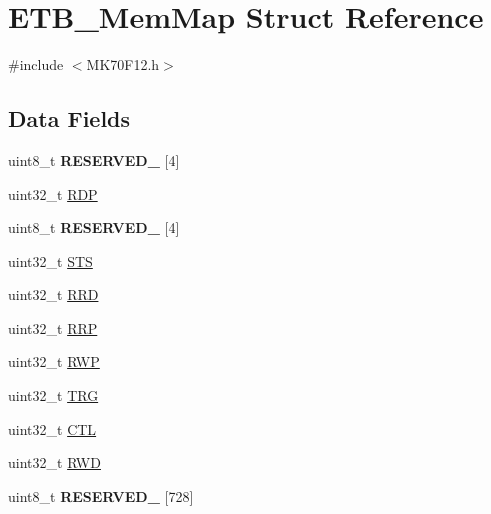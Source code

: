 \hypertarget{struct_e_t_b___mem_map}{}\section{E\+T\+B\+\_\+\+Mem\+Map Struct Reference}
\label{struct_e_t_b___mem_map}


{\ttfamily \#include $<$M\+K70\+F12.\+h$>$}

\subsection*{Data Fields}
\begin{DoxyCompactItemize}
\item 
\hypertarget{struct_e_t_b___mem_map_af724f31f25bbd8ea68c27823c1dad054}{}uint8\+\_\+t {\bfseries R\+E\+S\+E\+R\+V\+E\+D\+\_} \mbox{[}4\mbox{]}\label{struct_e_t_b___mem_map_af724f31f25bbd8ea68c27823c1dad054}

\item 
uint32\+\_\+t \hyperlink{struct_e_t_b___mem_map_a1c10bbda4ba1bbe562b76e90bcb1bc61}{R\+D\+P}
\item 
\hypertarget{struct_e_t_b___mem_map_a46ec445024c6bff3ddf1a8c85eea7fdd}{}uint8\+\_\+t {\bfseries R\+E\+S\+E\+R\+V\+E\+D\+\_} \mbox{[}4\mbox{]}\label{struct_e_t_b___mem_map_a46ec445024c6bff3ddf1a8c85eea7fdd}

\item 
uint32\+\_\+t \hyperlink{struct_e_t_b___mem_map_a5a471e968aca953fb748c16b10d56939}{S\+T\+S}
\item 
uint32\+\_\+t \hyperlink{struct_e_t_b___mem_map_a270d960dd4107f020db1f9bf7ef845df}{R\+R\+D}
\item 
uint32\+\_\+t \hyperlink{struct_e_t_b___mem_map_a891b26a3c18779f393b9f699f42c9916}{R\+R\+P}
\item 
uint32\+\_\+t \hyperlink{struct_e_t_b___mem_map_a32780b4c79a1f22e2616d845f306f264}{R\+W\+P}
\item 
uint32\+\_\+t \hyperlink{struct_e_t_b___mem_map_a96dc184cb9f6ea6ba7b299b05c58d4ed}{T\+R\+G}
\item 
uint32\+\_\+t \hyperlink{struct_e_t_b___mem_map_a12988dd241cd1b4936f513afcd6fa803}{C\+T\+L}
\item 
uint32\+\_\+t \hyperlink{struct_e_t_b___mem_map_a44fa135beae1216f33813266c1cdd08b}{R\+W\+D}
\item 
\hypertarget{struct_e_t_b___mem_map_aaced01756a620671a83f9c2d99741a1c}{}uint8\+\_\+t {\bfseries R\+E\+S\+E\+R\+V\+E\+D\+\_} \mbox{[}728\mbox{]}\label{struct_e_t_b___mem_map_aaced01756a620671a83f9c2d99741a1c}


\end{DoxyCompactItemize}
